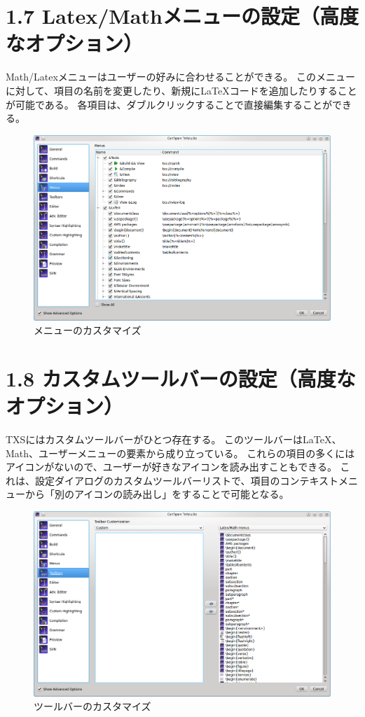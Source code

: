\documentclass[]{book}
\makeatletter
\def\maxwidth{\ifdim\Gin@nat@width>\linewidth\linewidth
\else\Gin@nat@width\fi}
\let\Oldincludegraphics\includegraphics
\renewcommand{\includegraphics}[1]{\Oldincludegraphics[width=\maxwidth]{#1}}
\makeatother
\begin{document}
\section{1.7 Latex/Mathメニューの設定（高度なオプション）}

Math/Latexメニューはユーザーの好みに合わせることができる。
このメニューに対して、項目の名前を変更したり、新規にLaTeXコードを追加したりすることが可能である。
各項目は、ダブルクリックすることで直接編集することができる。

\begin{figure}[htbp]
\centering
\includegraphics{configure_customizeMenu.png}
\caption{メニューのカスタマイズ}
\end{figure}

\section{1.8 カスタムツールバーの設定（高度なオプション）}

TXSにはカスタムツールバーがひとつ存在する。
このツールバーはLaTeX、Math、ユーザーメニューの要素から成り立っている。
これらの項目の多くにはアイコンがないので、ユーザーが好きなアイコンを読み出すこともできる。
これは、設定ダイアログのカスタムツールバーリストで、項目のコンテキストメニューから「別のアイコンの読み出し」をすることで可能となる。

\begin{figure}[htbp]
\centering
\includegraphics{configure_customToolbar.png}
\caption{ツールバーのカスタマイズ}
\end{figure}
\end{document}
